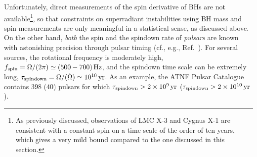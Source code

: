 \documentclass[11pt]{article}
\numberwithin{equation}{section} %
\begin{document}
Unfortunately, direct measurements of the spin derivative of BHs are not available\footnote{As previously discussed, observations of LMC X-3 and Cygnus X-1 are consistent with a constant spin on a time scale of the order of ten years, which gives a very mild bound compared to the one discussed in this section.}, so that constraints on superradiant instabilities using BH mass and spin measurements are only meaningful in a statistical sense, as discussed above. On the other hand, \emph{both} the spin and the spindown rate of \emph{pulsars} are known with astonishing precision through pulsar timing (cf., e.g., Ref.~\cite{lorimer2005handbook}). For several sources, the rotational frequency is moderately high, $f_{\rm spin}=\Omega/(2\pi)\simeq (500-700)\,{\rm Hz}$, and the spindown time scale can be extremely long, $\tau_{\rm spindown} = \Omega/(\dot\Omega)\simeq 10^{10}\,{\rm yr}$. As an example, the ATNF Pulsar Catalogue~\cite{catalogue,Manchester:2004bp} contains $398$ ($40$) pulsars for which $\tau_{\rm spindown}>2\times 10^9\,{\rm yr}$ ($\tau_{\rm spindown}>2\times 10^{10}\,{\rm yr}$).
\end{document}
